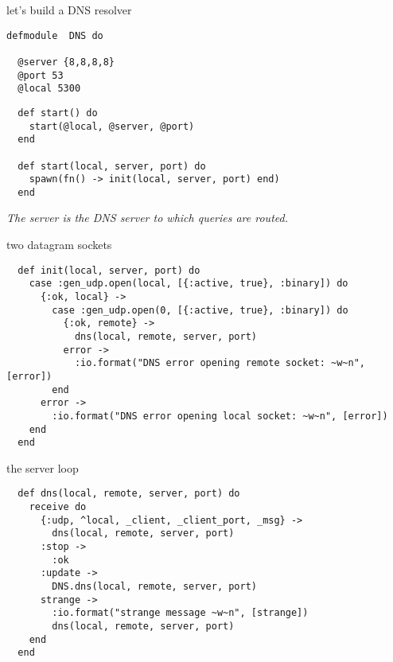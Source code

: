 \begin{frame}[fragile]{let's build a DNS resolver}
 
\pause

\begin{verbatim}
defmodule  DNS do

  @server {8,8,8,8}
  @port 53
  @local 5300
\end{verbatim}

\begin{verbatim}
  def start() do
    start(@local, @server, @port)
  end

  def start(local, server, port) do
    spawn(fn() -> init(local, server, port) end)
  end
\end{verbatim}

\vspace{10pt}\pause
{\em The server is the DNS server to which queries are routed.}
\end{frame}

\begin{frame}[fragile]{two datagram sockets}

\begin{verbatim}
  def init(local, server, port) do
    case :gen_udp.open(local, [{:active, true}, :binary]) do
      {:ok, local} ->
        case :gen_udp.open(0, [{:active, true}, :binary]) do
          {:ok, remote} ->
            dns(local, remote, server, port)
          error ->
            :io.format("DNS error opening remote socket: ~w~n", [error])
        end
      error ->
        :io.format("DNS error opening local socket: ~w~n", [error])
    end
  end
\end{verbatim}

\end{frame}

\begin{frame}[fragile]{the server loop}

\begin{verbatim}
  def dns(local, remote, server, port) do
    receive do
      {:udp, ^local, _client, _client_port, _msg} ->
        dns(local, remote, server, port)
      :stop ->
        :ok
      :update ->
        DNS.dns(local, remote, server, port)
      strange ->
        :io.format("strange message ~w~n", [strange])
        dns(local, remote, server, port)
    end
  end
\end{verbatim}

\vspace{20pt}

\end{frame}


